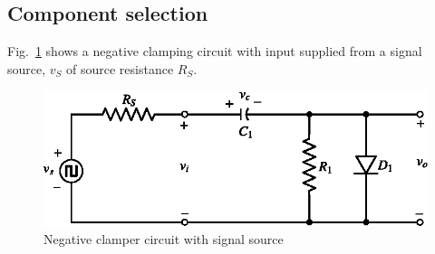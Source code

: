 \subsection{Component selection}\label{sec2.34.5}

Fig.~\ref{fig2.42} shows a negative clamping circuit with input supplied from a signal source, $v_{S}$ of source resistance $R_{S}$.
\begin{figure}[H]
\centering
\includegraphics{chap2/fig2.42.eps}
\caption{Negative clamper circuit with signal source}\label{fig2.42}
\end{figure}


